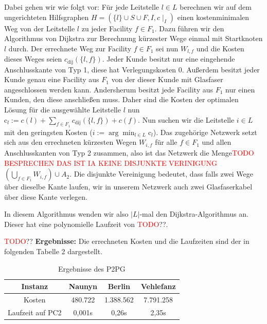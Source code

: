 \documentclass[11pt,a4paper]{article}
\newcommand{\TODO}{\textcolor{red}{TODO}}
\theoremstyle{my_th_style1}
\begin{document}
Dabei gehen wir wie folgt vor:
Für jede Leitstelle $ l \in L$ berechnen wir auf dem ungerichteten Hilfsgraphen $H=(\{l\} \cup S \cup F , I,c\mid_I)$ einen kostenminimalen Weg von der Leitstelle $l$ zu jeder Facility $f \in F_1$. Dazu führen wir den Algorithmus von Dijkstra zur Berechnung k\"urzester Wege einmal mit Startknoten $l$ durch.
Der errechnete Weg zur Facility \( f \in F_1\) sei nun $W_{l,f}$ und die Kosten dieses Weges seien $c_{\text{dij}}(\{l,f\})$. 
Jeder Kunde besitzt nur eine eingehende Anschlusskante von Typ 1, diese hat Verlegungskosten 0. 
Außerdem besitzt jeder Kunde genau eine Facility aus $F_1$ von der dieser Kunde mit Glasfaser angeschlossen werden kann. 
Andersherum besitzt jede Facility aus $F_1$ nur einen Kunden, den diese anschließen muss. 
Daher sind die Kosten der optimalen Lösung für die ausgewählte Leitstelle $l$ nun $\text{c}_l:=c(l) + \displaystyle\sum_{f \in F_1} c_{\text{dij}}(\{l,f\}) + c(f)$. 
Nun suchen wir die Leitstelle $i \in L$ mit den geringsten Kosten ($i:=\arg \displaystyle\min_{l \in L} \text{c}_l$). Das zugehörige Netzwerk setzt sich aus den errechneten kürzesten Wegen $W_{i,f}$ für alle $f \in F_1$ und allen Anschlusskanten von Typ 2 zusammen, also ist das Netzwerk die Menge\textcolor{red}{TODO BESPRECHEN DAS IST IA KEINE DISJUNKTE VERINIGUNG} $(\bigcup_{f \in F_1 }W_{i,f}) \cup A_2 $. Die disjunkte Vereinigung bedeutet, dass falls zwei Wege über dieselbe Kante laufen, wir in unserem Netzwerk auch zwei Glasfaserkabel über diese Kante verlegen.

In diesem Algorithmus wenden wir also $|L|$-mal den Dijkstra-Algorithmus an. Dieser hat eine polynomielle Laufzeit von \TODO??. 

\TODO??
\textbf{Ergebnisse:} Die errechneten Kosten und die Laufzeiten sind der in folgenden Tabelle 2 dargestellt.
\begin{table}[h]
	\centering
	\begin{tabular}{c|c|c|c}
		 Instanz & Naunyn & Berlin & Vehlefanz \\	
		\hline
		Kosten & 480.722 & 1.388.562 & 7.791.258 \\
		Laufzeit auf PC2 & 0,001s & 0,26s & 2,35s\\
	\end{tabular}
	\label{P2PG}
	\caption{Ergebnisse des P2PG} 
\end{table}
\end{document}
